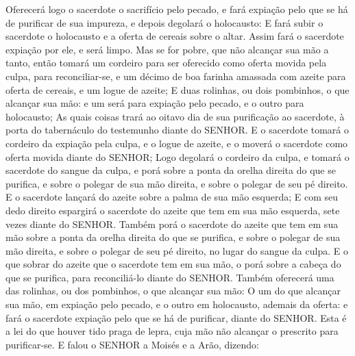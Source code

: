 {{  Oferecerá logo o sacerdote o sacrifício pelo pecado, e fará expiação pelo que se há de purificar de sua impureza, e depois degolará o holocausto:
  E fará subir o sacerdote o holocausto e a oferta de cereais sobre o altar. Assim fará o sacerdote expiação por ele, e será limpo.
  Mas se for pobre, que não alcançar sua mão a tanto, então tomará um cordeiro para ser oferecido como oferta movida pela culpa, para reconciliar-se, e um décimo
{} de boa farinha amassada com azeite para oferta de cereais, e um logue de azeite;
  E duas rolinhas, ou dois pombinhos, o que alcançar sua mão: e um será para expiação pelo pecado, e o outro para holocausto;
  As quais coisas trará ao oitavo dia de sua purificação ao sacerdote, à porta do tabernáculo do testemunho diante do SENHOR.
  E o sacerdote tomará o cordeiro da expiação pela culpa, e o logue de azeite, e o moverá o sacerdote como oferta movida diante do SENHOR;
  Logo degolará o cordeiro da culpa, e tomará o sacerdote do sangue da culpa, e porá sobre a ponta da orelha direita do que se purifica, e sobre o polegar de sua mão direita, e sobre o polegar de seu pé direito.
  E o sacerdote lançará do azeite sobre a palma de sua mão esquerda;
  E com seu dedo direito espargirá o sacerdote do azeite que tem em sua mão esquerda, sete vezes diante do SENHOR.
  Também porá o sacerdote do azeite que tem em sua mão sobre a ponta da orelha direita do que se purifica, e sobre o polegar de sua mão direita, e sobre o polegar de seu pé direito, no lugar do sangue da culpa.
  E o que sobrar do azeite que o sacerdote tem em sua mão, o porá sobre a cabeça do que se purifica, para reconciliá-lo diante do SENHOR.
  Também oferecerá uma das rolinhas, ou dos pombinhos, o que alcançar sua mão:
  O um do que alcançar sua mão, em expiação pelo pecado, e o outro em holocausto, ademais da oferta: e fará o sacerdote expiação pelo que se há de purificar, diante do SENHOR.
  Esta é a lei do que houver tido praga de lepra, cuja mão não alcançar o prescrito para purificar-se}.
  E falou o SENHOR a Moisés e a Arão, dizendo:
  }
